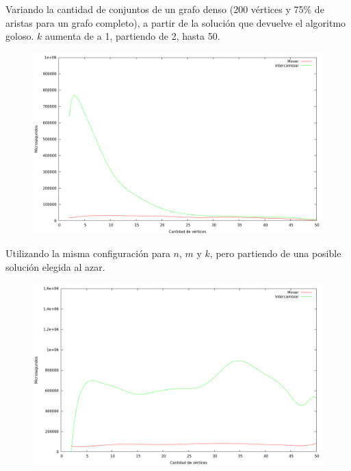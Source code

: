 Variando la cantidad de conjuntos de un grafo denso (200 vértices y 75\% de
aristas para un grafo completo), a partir de la solución que devuelve el
algoritmo goloso. $k$ aumenta de a 1, partiendo de 2, hasta 50.

\vspace*{0.5cm}

\begin{figure}[H]
  \begin{center}
    \includegraphics[scale=0.35]{imagenes/local-goloso-k-tiempo.png}
  \end{center}
\end{figure}

\vspace*{0.5cm}


Utilizando la misma configuración para $n$, $m$ y $k$, pero partiendo de una
posible solución elegida al azar.

\vspace*{0.5cm}

\begin{figure}[H]
  \begin{center}
    \includegraphics[scale=0.35]{imagenes/local-random-k-tiempo.png}
  \end{center}
\end{figure}

